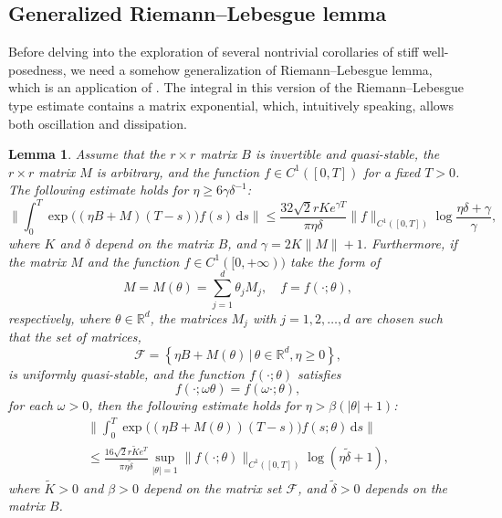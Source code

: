 \documentclass{article}
\theoremstyle{plain}%
\newtheorem{lemma}{Lemma}%
\theoremstyle{definition}%
\theoremstyle{remark}%
\newcommand{\bR}{\mathbb{R}}
\newcommand{\cF}{\mathcal{F}}
\newcommand{\rd}{\mathrm{d}}
\newcommand{\+}[1]{{\bm{#1}}}
\newcommand{\norm}[1]{\|{#1}\|}
\begin{document}
\subsection{Generalized Riemann--Lebesgue lemma}
Before delving into the exploration of several nontrivial corollaries 
of stiff well-posedness, we need a somehow generalization of 
Riemann--Lebesgue lemma, 
which is an application of . 
The integral in this version of the Riemann--Lebesgue type estimate 
contains a matrix exponential, which, intuitively speaking, allows 
both oscillation and dissipation.

\begin{lemma}\label{lemma:gRL}
  Assume that the $r \times r$ matrix $B$ is invertible and 
  quasi-stable, the $r \times r$ matrix $M$ is arbitrary,
  and the function $f \in C^1([0, T])$ for a fixed $T > 0$.
  The following estimate holds for 
  $\eta \ge 6 \gamma \delta^{-1}$:
  \begin{displaymath}
    \bigg\| \int_0^T \exp \big( (\eta B + M) (T - s) \big) f(s) 
    \,\rd s \bigg\| \le \frac{32 \sqrt{2} r K e^{\gamma T}}
    {\pi \eta \delta} \|f\|_{C^1([0, T])} \log 
    \frac{\eta \delta + \gamma}{\gamma},
  \end{displaymath}
  where $K$ and $\delta$ depend on the matrix $B$, and 
  $\gamma = 2 K \norm{M} + 1$.
  Furthermore, if the matrix $M$ and the function 
  $f \in C^1([0, +\infty))$ take the form of 
  \begin{displaymath}
    M = M(\theta) = \sum_{j = 1}^d \theta_j M_j, \quad 
    f = f(\cdot; \theta),
  \end{displaymath}
  respectively, where $\theta \in \bR^d$, the matrices $M_j$ with 
  $j = 1, 2, \ldots, d$ are chosen such that the set of matrices,
  \begin{displaymath}
    \cF = \left\{ \eta B + M(\theta) \,\big|\, 
    \theta \in \bR^d, \eta \ge 0 \right\},
  \end{displaymath}
  is uniformly quasi-stable, 
  and the function $f(\cdot; \theta)$ satisfies 
  \begin{displaymath}
    f(\cdot; \omega \theta) = f(\omega \cdot; \theta),
  \end{displaymath}
  for each $\omega > 0$,
  then the following estimate holds for $\eta >\beta (|\theta| + 1)$:
  \begin{multline*}
    \bigg\| \int_0^T \exp \big( (\eta B + M(\theta)) (T - s) \big) 
    f(s; \theta) \,\rd s \bigg\| \\ \le
    \frac{16 \sqrt{2} r \tilde{K} e^T}{\pi \eta \tilde{\delta}} 
    \sup_{|\theta| = 1} \|f(\cdot; \theta)\|_{C^1([0, T])} 
    \log(\eta \tilde{\delta} + 1), 
  \end{multline*}
  where $\tilde{K} > 0$ and $\beta > 0$ depend on the matrix 
  set $\cF$, and $\tilde{\delta} > 0$ depends on the matrix $B$.
\end{lemma}
\end{document}
